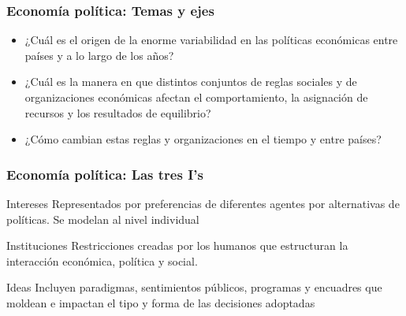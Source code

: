 \documentclass[14pt,aspectratio=169]{beamer}
\begin{document}
\begin{frame}\frametitle{Economía política: Temas y ejes}
  \begin{itemize}
    \item ¿Cuál es el origen de la enorme variabilidad en las políticas
económicas entre países y a lo largo de los años?
\item ¿Cuál es la manera en que distintos conjuntos de reglas sociales y de
organizaciones económicas afectan el comportamiento, la asignación de
recursos y los resultados de equilibrio?
\item ¿Cómo cambian estas reglas y organizaciones en el tiempo y entre países?
\end{itemize}
\end{frame}



\begin{frame}\frametitle{Economía política: Las tres I's}
\begin{block}{Intereses}
Representados por preferencias de diferentes agentes por alternativas
de políticas. Se modelan al nivel individual
\end{block}
  \begin{block}{Instituciones}
Restricciones creadas por los humanos que estructuran la interacción
económica, política y social.
\end{block}
\begin{block}{Ideas}
Incluyen paradigmas, sentimientos públicos, programas y encuadres que
moldean e impactan el tipo y forma de las decisiones adoptadas
\end{block}
\end{frame}
\end{document}
